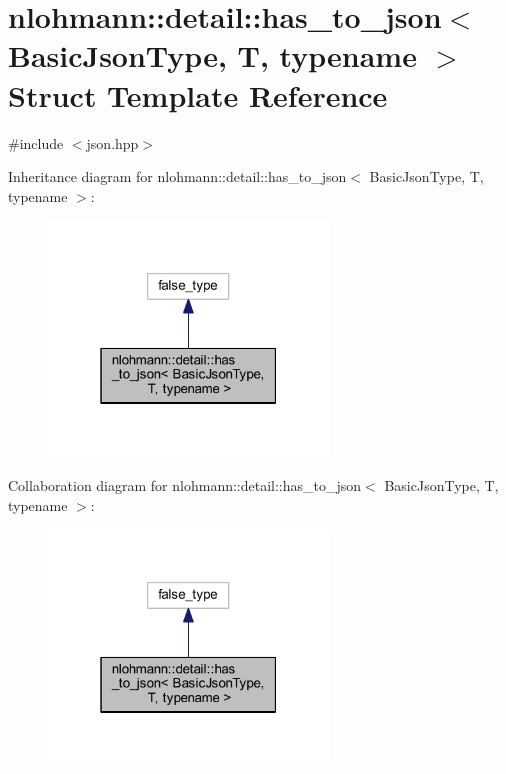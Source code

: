 \hypertarget{structnlohmann_1_1detail_1_1has__to__json}{}\section{nlohmann\+::detail\+::has\+\_\+to\+\_\+json$<$ Basic\+Json\+Type, T, typename $>$ Struct Template Reference}
\label{structnlohmann_1_1detail_1_1has__to__json}


{\ttfamily \#include $<$json.\+hpp$>$}



Inheritance diagram for nlohmann\+::detail\+::has\+\_\+to\+\_\+json$<$ Basic\+Json\+Type, T, typename $>$\+:
\nopagebreak
\begin{figure}[H]
\begin{center}
\leavevmode
\includegraphics[width=211pt]{structnlohmann_1_1detail_1_1has__to__json__inherit__graph}
\end{center}
\end{figure}


Collaboration diagram for nlohmann\+::detail\+::has\+\_\+to\+\_\+json$<$ Basic\+Json\+Type, T, typename $>$\+:
\nopagebreak
\begin{figure}[H]
\begin{center}
\leavevmode
\includegraphics[width=211pt]{structnlohmann_1_1detail_1_1has__to__json__coll__graph}
\end{center}
\end{figure}


